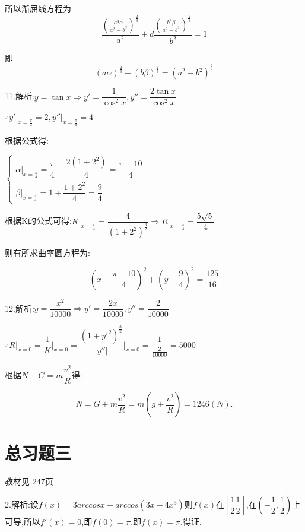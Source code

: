 所以渐屈线方程为\[\dfrac{{{{(\frac{{{a^4}\alpha }}{{{a^2} - {b^2}}})}^{\frac{2}{3}}}}}{{{a^2}}} + d\frac{{{{(\frac{{{b^4}\beta }}{{{a^2} - {b^2}}})}^{\frac{2}{3}}}}}{{{b^2}}} = 1\]

即\[{(a\alpha )^{\frac{2}{3}}} + {(b\beta )^{\frac{2}{3}}} = {({a^2} - {b^2})^{\frac{2}{3}}}\]

11.解析:$y = \tan x \Rightarrow y' = \dfrac{1}{{{{\cos }^2}x}},y'' = \dfrac{{2\tan x}}{{{{\cos }^2}x}}$

$\therefore y'{|_{x = \frac{\pi }{4}}} = 2,y''{|_{x = \frac{\pi }{4}}} = 4$

根据公式得:

$\left\{ \begin{array}{l}
\alpha {|_{x = \frac{\pi }{4}}} = \dfrac{\pi }{4} - \dfrac{{2(1 + {2^2})}}{4} = \dfrac{{\pi  - 10}}{4}\\
\beta {|_{x = \frac{\pi }{4}}} = 1 + \dfrac{{1 + {2^2}}}{4} = \dfrac{9}{4}
\end{array} \right.$


根据K的公式可得:$K{|_{x = \frac{\pi }{4}}} = \dfrac{4}{{{{(1 + {2^2})}^{\frac{3}{2}}}}} \Rightarrow R{|_{x = \frac{\pi }{4}}} = \dfrac{{5\sqrt 5 }}{4}$

则有所求曲率圆方程为:

\[{(x - \dfrac{{\pi  - 10}}{4})^2} + {(y - \dfrac{9}{4})^2} = \dfrac{{125}}{{16}}\]

12.解析:$y = \dfrac{{{x^2}}}{{10000}} \Rightarrow y' = \dfrac{{2x}}{{10000}},y'' = \dfrac{2}{{10000}}$

$\therefore R{|_{x = 0}} = \dfrac{1}{K}{|_{x = 0}} = \dfrac{{{{(1 + {{y'}^2})}^{\frac{3}{2}}}}}{{|y''|}}{|_{x = 0}} = \dfrac{1}{{\frac{2}{{10000}}}} = 5000$

根据$N - G = m\dfrac{{{v^2}}}{R}$得:

\[N = G + m\dfrac{{{v^2}}}{R} = m(g + \dfrac{{{v^2}}}{R}) = 1246(N).\]

\section{总习题三}
\begin{flushright}
  \color{zhanqing!80}
   教材见 247页 %
\end{flushright}

2.解析:设$f(x) = 3arccos x - arccos(3x - 4x^3)$则$f(x)$在$\left[  \dfrac{1}{2}\dfrac{1}{2} \right]$,在$\left( { - \dfrac{1}{2},\dfrac{1}{2}} \right)$上可导,所以$f'\left( x \right) = 0$,即$f\left( 0 \right) = \pi $,即$f\left( x \right) = \pi $.得证.

